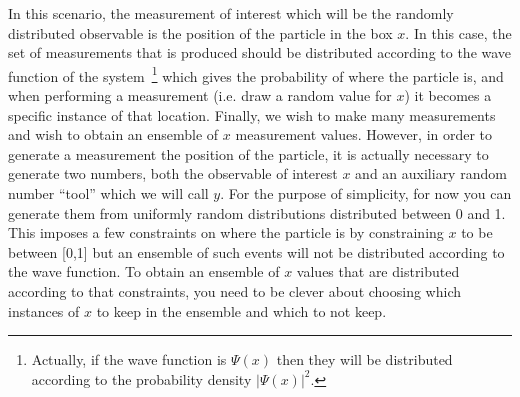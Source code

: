 \documentclass[UKenglish,texlive=2016]{\ATLASLATEXPATH atlasdoc}
\begin{document}
In this scenario, the measurement of interest which will be the randomly distributed observable is the position of the particle in the box $x$.  In this case, the set of measurements that is produced should be distributed according to the wave function of the system~\footnote{Actually, if the wave function is $\Psi(x)$ then they will be distributed according to the probability density $|\Psi(x)|^2$.} which gives the probability of where the particle is, and when performing a measurement (i.e. draw a random value for $x$) it becomes a specific instance of that location.  Finally, we wish to make many measurements and wish to obtain an ensemble of $x$ measurement values.  However, in order to generate a measurement the position of the particle, it is actually necessary to generate two numbers, both the observable of interest $x$ and an auxiliary random number ``tool'' which we will call $y$.  For the purpose of simplicity, for now you can generate them from uniformly random distributions distributed between 0 and 1.  This imposes a few constraints on where the particle is by constraining $x$ to be between [0,1] but an ensemble of such events will not be distributed according to the wave function.  To obtain an ensemble of $x$ values that are distributed according to that constraints, you need to be clever about choosing which instances of $x$ to keep in the ensemble and which to not keep.  
\end{document}
